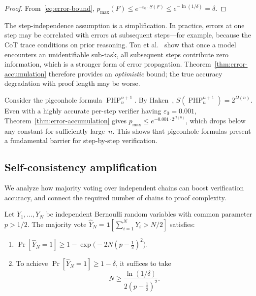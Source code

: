 \begin{proof}
From~\eqref{eq:error-bound},
$p_{\max}(F) \le e^{-\varepsilon_0 \cdot S(F)} \le e^{-\ln(1/\delta)} =
\delta$.
\end{proof}

\begin{remark}\label{rem:step-independence}
The step-independence assumption is a simplification.  In practice, errors at
one step may be correlated with errors at subsequent steps---for example,
because the CoT trace conditions on prior reasoning.  Ton et
al.~\cite{ton2025understanding} show that once a model encounters an
unidentifiable sub-task, all subsequent steps contribute zero information,
which is a stronger form of error propagation.  Theorem~\ref{thm:error-accumulation}
therefore provides an \emph{optimistic} bound; the true accuracy degradation
with proof length may be worse.
\end{remark}

\begin{example}\label{ex:php-accuracy}
Consider the pigeonhole formula $\operatorname{PHP}^{n+1}_n$.  By
Haken~\cite{haken1985intractability}, $S(\operatorname{PHP}^{n+1}_n) =
2^{\Omega(n)}$.  Even with a highly accurate per-step verifier having
$\varepsilon_0 = 0.001$, Theorem~\ref{thm:error-accumulation} gives
$p_{\max} \le e^{-0.001 \cdot 2^{\Omega(n)}}$, which drops below any
constant for sufficiently large~$n$.  This shows that pigeonhole formulas
present a fundamental barrier for step-by-step verification.
\end{example}

\subsection{Self-consistency amplification}\label{sec:amplification}

We analyze how majority voting over independent chains can boost verification
accuracy, and connect the required number of chains to proof complexity.

\begin{theorem}\label{thm:self-consistency}
Let $Y_1, \ldots, Y_N$ be independent Bernoulli random variables with common
parameter $p > 1/2$.  The majority vote
$\hat{Y}_N = \mathbf{1}[\sum_{i=1}^N Y_i > N/2]$ satisfies:
\begin{enumerate}[label=(\alph*)]
\item $\Pr[\hat{Y}_N = 1] \ge 1 - \exp\bigl(-2N(p - \tfrac{1}{2})^2\bigr)$.
\item To achieve $\Pr[\hat{Y}_N = 1] \ge 1 - \delta$, it suffices to take
\begin{equation}\label{eq:chains-needed}
N \ge \frac{\ln(1/\delta)}{2(p - \tfrac{1}{2})^2}.
\end{equation}
\end{enumerate}
\end{theorem}


